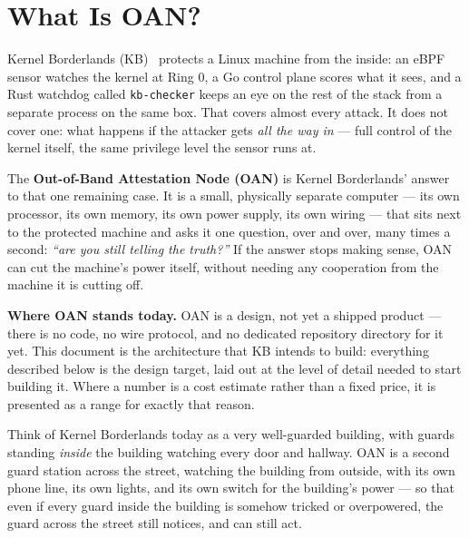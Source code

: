 \documentclass[11pt,a4paper]{article}
\begin{document}
\tableofcontents
\thispagestyle{plain}
\clearpage

\section{What Is OAN?}
\label{sec:what-is-oan}

Kernel Borderlands (KB)~\cite{repo} protects a Linux machine from the inside: an
eBPF sensor watches the kernel at Ring 0, a Go control plane scores what
it sees, and a Rust watchdog called \texttt{kb-checker} keeps an eye on
the rest of the stack from a separate process on the same box. That
covers almost every attack. It does not cover one: what happens if the
attacker gets \emph{all the way in} --- full control of the kernel
itself, the same privilege level the sensor runs at.

The \textbf{Out-of-Band Attestation Node (OAN)} is Kernel Borderlands'
answer to that one remaining case. It is a small, physically separate
computer --- its own processor, its own memory, its own power supply,
its own wiring --- that sits next to the protected machine and asks it
one question, over and over, many times a second: \emph{``are you still
telling the truth?''} If the answer stops making sense, OAN can cut the
machine's power itself, without needing any cooperation from the
machine it is cutting off.

\begin{statusbox}
\textbf{Where OAN stands today.} OAN is a design, not yet a shipped
product --- there is no code, no wire protocol, and no dedicated
repository directory for it yet. This document is the architecture that
KB intends to build: everything described below is the design target,
laid out at the level of detail needed to start building it. Where a
number is a cost estimate rather than a fixed price, it is presented as
a range for exactly that reason.
\end{statusbox}

\begin{plainbox}
Think of Kernel Borderlands today as a very well-guarded building, with
guards standing \emph{inside} the building watching every door and
hallway. OAN is a second guard station across the street, watching the
building from outside, with its own phone line, its own lights, and its
own switch for the building's power --- so that even if every guard
inside the building is somehow tricked or overpowered, the guard across
the street still notices, and can still act.
\end{plainbox}
\end{document}
